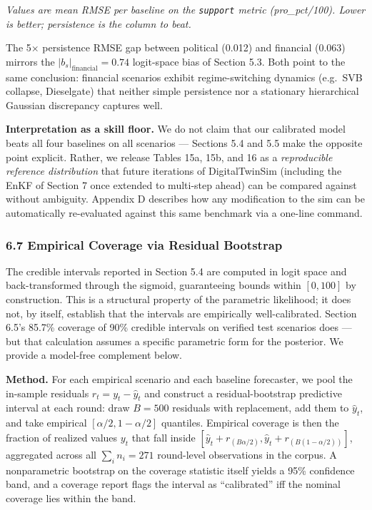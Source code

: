 \documentclass[
]{article}
\begin{document}
\emph{Values are mean RMSE per baseline on the \texttt{support} metric
(pro\_pct/100). Lower is better; persistence is the column to beat.}

The 5× persistence RMSE gap between political (0.012) and financial
(0.063) mirrors the \(|b_s|_\text{financial} = 0.74\) logit-space bias
of Section 5.3. Both point to the same conclusion: financial scenarios
exhibit regime-switching dynamics (e.g.~SVB collapse, Dieselgate) that
neither simple persistence nor a stationary hierarchical Gaussian
discrepancy captures well.

\textbf{Interpretation as a skill floor.} We do not claim that our
calibrated model beats all four baselines on all scenarios --- Sections
5.4 and 5.5 make the opposite point explicit. Rather, we release Tables
15a, 15b, and 16 as a \emph{reproducible reference distribution} that
future iterations of DigitalTwinSim (including the EnKF of Section 7
once extended to multi-step ahead) can be compared against without
ambiguity. Appendix D describes how any modification to the sim can be
automatically re-evaluated against this same benchmark via a one-line
command.

\subsubsection{6.7 Empirical Coverage via Residual
Bootstrap}\label{empirical-coverage-via-residual-bootstrap}

The credible intervals reported in Section 5.4 are computed in logit
space and back-transformed through the sigmoid, guaranteeing bounds
within \([0, 100]\) by construction. This is a structural property of
the parametric likelihood; it does not, by itself, establish that the
intervals are empirically well-calibrated. Section 6.5's 85.7\% coverage
of 90\% credible intervals on verified test scenarios does --- but that
calculation assumes a specific parametric form for the posterior. We
provide a model-free complement below.

\textbf{Method.} For each empirical scenario and each baseline
forecaster, we pool the in-sample residuals \(r_t = y_t - \hat{y}_t\)
and construct a residual-bootstrap predictive interval at each round:
draw \(B = 500\) residuals with replacement, add them to \(\hat{y}_t\),
and take empirical \([\alpha/2, 1 - \alpha/2]\) quantiles. Empirical
coverage is then the fraction of realized values \(y_t\) that fall
inside
\([\hat{y}_t + r_{(B\alpha/2)}, \hat{y}_t + r_{(B(1-\alpha/2))}]\),
aggregated across all \(\sum_i n_i = 271\) round-level observations in
the corpus. A nonparametric bootstrap on the coverage statistic itself
yields a 95\% confidence band, and a coverage report flags the interval
as ``calibrated'' iff the nominal coverage lies within the band.
\end{document}
